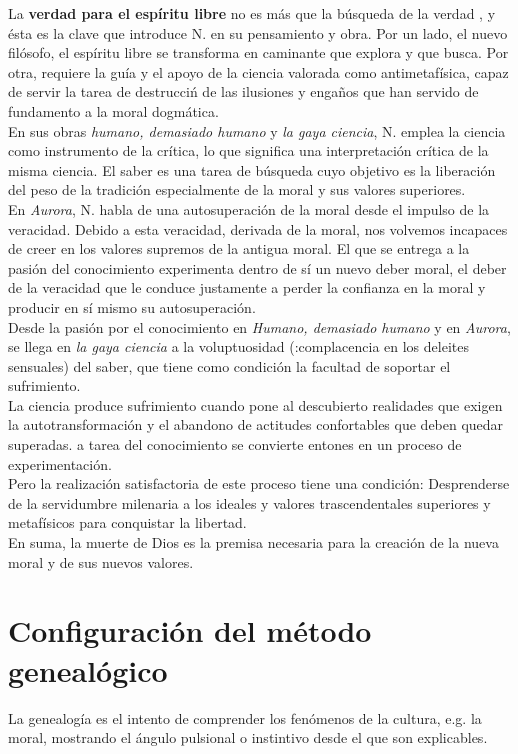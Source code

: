 \documentclass[a4paper, 10pt, twocolumn, spanish]{article}
\begin{document}
La \textbf{verdad para el espíritu libre} no es más que la búsqueda de la
verdad , y ésta es la clave que introduce N. en su pensamiento y
obra. Por un lado, el nuevo filósofo, el espíritu libre se transforma
en caminante que explora y que busca. Por otra, requiere la guía y el
apoyo de la ciencia valorada como antimetafísica, capaz de servir la
tarea de destrucciń de las ilusiones y engaños que han servido de
fundamento a la moral dogmática.\\[0pt]

En sus obras \emph{humano, demasiado humano} y \emph{la gaya ciencia}, N. emplea
la ciencia como instrumento de la crítica, lo que significa una
interpretación crítica de la misma ciencia. El saber es una tarea de
búsqueda cuyo objetivo es la liberación del peso de la tradición
especialmente de la moral y sus valores superiores.\\[0pt]

En \emph{Aurora}, N. habla de una autosuperación de la moral desde el
impulso de la veracidad. Debido a esta veracidad, derivada de la
moral, nos volvemos incapaces de creer en los valores supremos de la
antigua moral. El que se entrega a la pasión del conocimiento
experimenta dentro de sí un nuevo deber moral, el deber de la
veracidad que le conduce justamente a perder la confianza en la moral
y producir en sí mismo su autosuperación.\\[0pt]

Desde la pasión por el conocimiento en \emph{Humano, demasiado humano} y en
\emph{Aurora}, se llega en \emph{la gaya ciencia} a la voluptuosidad
(:complacencia en los deleites sensuales) del saber, que tiene como
condición la facultad de soportar el sufrimiento.\\[0pt]
La ciencia produce sufrimiento cuando pone al descubierto realidades
que exigen la autotransformación y el abandono de actitudes
confortables que deben quedar superadas. a tarea del conocimiento se
convierte entones en un proceso de experimentación.\\[0pt]
Pero la realización satisfactoria de este proceso tiene una condición:
Desprenderse de la servidumbre milenaria a los ideales y valores
trascendentales superiores y metafísicos para conquistar la libertad.\\[0pt]

En suma, la muerte de Dios es la premisa necesaria para la creación de
la nueva moral y de sus nuevos valores.

\section{Configuración del método genealógico}
\label{sec:org7ecccb2}
La genealogía es el intento de comprender los fenómenos de la cultura,
e.g. la moral, mostrando el ángulo pulsional o instintivo desde el que
son explicables.\\[0pt]
\end{document}
